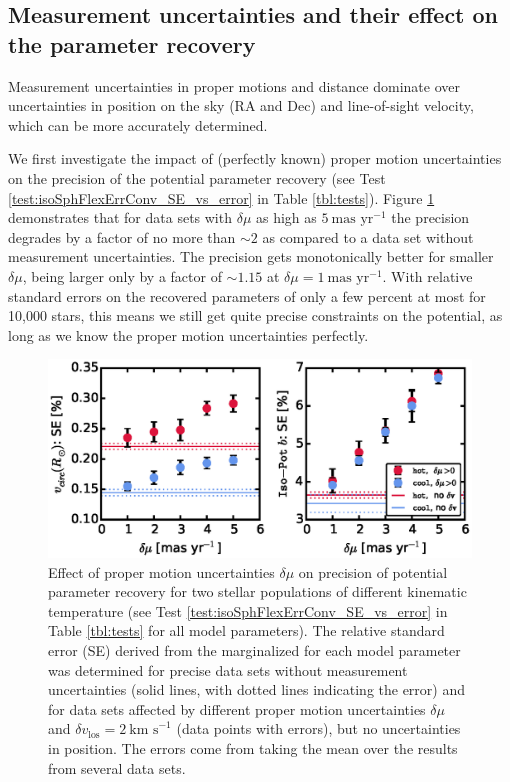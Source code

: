 \subsection{Measurement uncertainties and their effect on the parameter recovery} \label{sec:results_errors}

Measurement uncertainties in proper motions and distance dominate over uncertainties in position on the sky (RA and Dec) and line-of-sight velocity, which can be more accurately determined.

We first investigate the impact of (perfectly known) proper motion uncertainties on the precision of the potential parameter recovery (see Test \ref{test:isoSphFlexErrConv_SE_vs_error} in Table \ref{tbl:tests}). Figure \ref{fig:isoSphFlexErrConv_SE_vs_error} demonstrates that for data sets with $\delta \mu$ as high as $5~\text{mas yr}^{-1}$ the precision degrades by  a factor of no more than $\sim2$ as compared to a data set without measurement uncertainties. The precision gets monotonically better for smaller $\delta \mu$, being larger only by a factor of $\sim 1.15$ at $\delta \mu=1~\text{mas yr}^{-1}$. With relative standard errors on the recovered parameters of only a few percent at most for 10,000 stars, this means we still get quite precise constraints on the potential, as long as we know the proper motion uncertainties perfectly.


\begin{figure}[!htbp]
\centering
\includegraphics[width=\columnwidth]{figs/isoSphFlexErrConv_SE_vs_error.eps}
\caption{Effect of proper motion uncertainties $\delta \mu$ on precision of potential parameter recovery for two stellar populations of different kinematic temperature (see Test \ref{test:isoSphFlexErrConv_SE_vs_error} in Table \ref{tbl:tests} for all model parameters). The relative standard error (SE) derived from the marginalized \pdf{} for each model parameter was determined for precise data sets without measurement uncertainties (solid lines, with dotted lines indicating the error) and for data sets affected by different proper motion uncertainties $\delta \mu$ and $\delta v_\text{los}=2~\text{km s}^{-1}$ (data points with errors), but no uncertainties in position. The errors come from taking the mean over the results from several data sets.}
\label{fig:isoSphFlexErrConv_SE_vs_error}
\end{figure}


